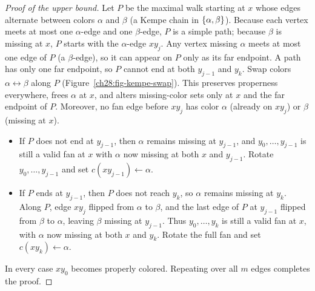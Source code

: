 \begin{proof}[Proof of the upper bound]
Let $P$ be the maximal walk starting at $x$ whose edges alternate between colors $\alpha$ and $\beta$ (a Kempe chain in $\{\alpha,\beta\}$). Because each vertex meets at most one $\alpha$-edge and one $\beta$-edge, $P$ is a simple path; because $\beta$ is missing at $x$, $P$ starts with the $\alpha$-edge $xy_j$. Any vertex missing $\alpha$ meets at most one edge of $P$ (a $\beta$-edge), so it can appear on $P$ only as its far endpoint. A path has only one far endpoint, so $P$ cannot end at both $y_{j-1}$ and $y_k$. Swap colors $\alpha\leftrightarrow\beta$ along $P$ (Figure~\ref{ch28:fig-kempe-swap}). This preserves properness everywhere, frees $\alpha$ at $x$, and alters missing-color sets only at $x$ and the far endpoint of $P$. Moreover, no fan edge before $xy_j$ has color $\alpha$ (already on $xy_j$) or $\beta$ (missing at $x$).
\begin{itemize}
  \item If $P$ does not end at $y_{j-1}$, then $\alpha$ remains missing at
        $y_{j-1}$, and $y_0,\dots,y_{j-1}$ is still a valid fan at $x$ with $\alpha$ now missing at both $x$ and $y_{j-1}$. Rotate $y_0,\dots,y_{j-1}$ and set $c(xy_{j-1})\leftarrow\alpha$.
  \item If $P$ ends at $y_{j-1}$, then $P$ does not reach $y_k$, so $\alpha$ remains missing
        at $y_k$. Along $P$, edge $xy_j$ flipped from $\alpha$ to $\beta$, and the last edge of $P$ at $y_{j-1}$ flipped from $\beta$ to $\alpha$, leaving $\beta$ missing at
        $y_{j-1}$. Thus $y_0,\dots,y_k$ is still a valid fan at $x$, with $\alpha$ now missing at both $x$ and $y_k$. Rotate the full fan and set $c(xy_k)\leftarrow\alpha$.
\end{itemize}
In every case $xy_0$ becomes properly colored. Repeating over all $m$ edges completes the proof.
\end{proof}

